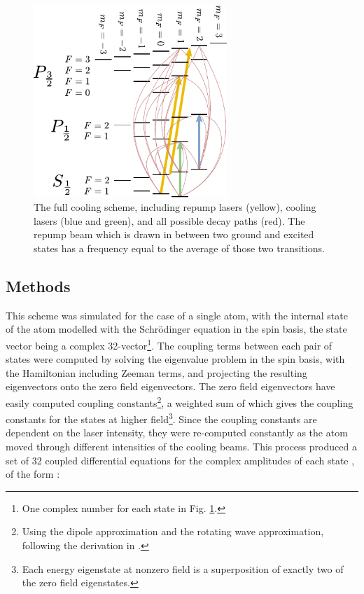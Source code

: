\begin{figure}
\begin{center}
\includegraphics[width=0.65\textwidth]{figures/unsorted/cooling_full.pdf}
\caption{\label{fig:cooling_full} The full cooling scheme, including repump lasers (yellow), cooling lasers (blue and green), and all possible decay paths (red). The repump beam which is drawn in between two ground and excited states has a frequency equal to the average of those two transitions. }
\end{center}
\end{figure}

\subsection{Methods}

This scheme was simulated for the case of a single atom, with the internal state of the atom modelled with the Schr\"odinger equation in the spin basis, the state vector being a complex 32-vector\footnote{One complex number for each state in Fig. \ref{fig:cooling_full}.}. The coupling terms between each pair of states were computed by solving the eigenvalue problem in the spin basis, with the Hamiltonian including Zeeman terms, and projecting the resulting eigenvectors onto the zero field eigenvectors. The zero field eigenvectors have easily computed coupling constants\footnote{Using the dipole approximation and the rotating wave approximation, following the derivation in \cite[p 9]{steck_rubidium_2010}.}, a weighted sum of which gives the coupling constants for the states at higher field\footnote{Each energy eigenstate at nonzero field is a superposition of exactly two of the zero field eigenstates.}. Since the coupling constants are dependent on the laser intensity, they were re-computed constantly as the atom moved through different intensities of the cooling beams. This process produced a set of 32 coupled differential equations for the complex amplitudes of each state \cite[p 4]{metcalf_laser_1999}, of the form :

